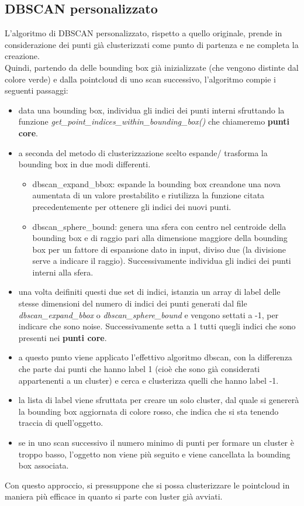\documentclass[italian]{report}
\begin{document}
\subsection{DBSCAN personalizzato}
L'algoritmo di DBSCAN personalizzato, rispetto a quello originale, prende in considerazione dei punti già clusterizzati come punto di partenza e ne completa la creazione.\\
Quindi, partendo da delle bounding box già inizializzate (che vengono distinte dal colore verde) e dalla pointcloud di uno scan successivo, l'algoritmo compie i seguenti passaggi:
\begin{itemize}
	\item data una bounding box, individua gli indici dei punti interni sfruttando la funzione \textit{get\_point\_indices\_within\_bounding\_box()} che chiameremo \textbf{punti core}.
	\item a seconda del metodo di clusterizzazione scelto espande/ trasforma la bounding box in due modi differenti.
		\begin{itemize}
			\item dbscan\_expand\_bbox: espande la bounding box creandone una nova aumentata di un valore prestabilito e riutilizza la funzione citata precedentemente per ottenere gli indici dei nuovi punti.
			\item dbscan\_sphere\_bound: genera una sfera con centro nel centroide della bounding box e di raggio pari alla dimensione maggiore della bounding box per un fattore di espansione dato in input, diviso due 					(la divisione serve a indicare il raggio). Successivamente individua gli indici dei punti interni alla sfera.
		\end{itemize}
	\item una volta deifiniti questi due set di indici, istanzia un array di label delle stesse dimensioni del numero di indici dei punti generati dal file \textit{dbscan\_expand\_bbox} o \textit{dbscan\_sphere\_bound} e vengono settati a -1, per indicare che sono noise. Successivamente setta a 1 tutti quegli indici che sono presenti nei \textbf{punti core}.
	\item a questo punto viene applicato l'effettivo algoritmo dbscan, con la differenza che parte dai punti che hanno label 1 (cioè che sono già considerati appartenenti a un cluster) e cerca e clusterizza quelli che hanno label -1.
	\item la lista di label viene sfruttata per creare un solo cluster, dal quale si genererà la bounding box aggiornata di colore rosso, che indica che si sta tenendo traccia di quell'oggetto.
	\item se in uno scan successivo il numero minimo di punti per formare un cluster è troppo basso, l'oggetto non viene più seguito e viene cancellata la bounding box associata.
\end{itemize}
Con questo approccio, si pressuppone che si possa clusterizzare le pointcloud in maniera più efficace in quanto si parte con luster già avviati.\\
\end{document}
